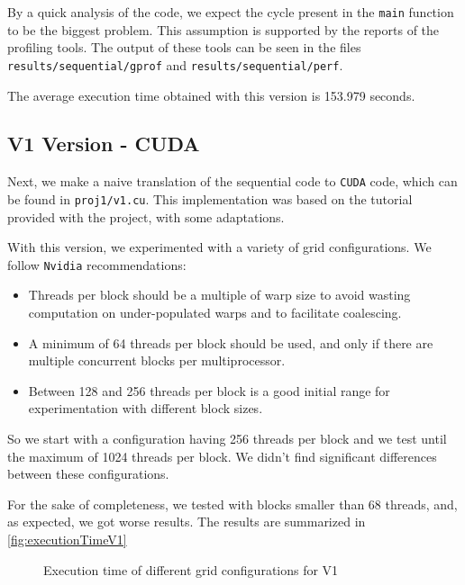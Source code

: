 \documentclass[conference]{IEEEtran}
\begin{document}
By a quick analysis of the code, we expect the cycle present in the \texttt{main} function to be the biggest problem. This assumption is supported by the reports of the profiling tools. The output of these tools can be seen in the files \texttt{results/sequential/gprof} and \texttt{results/sequential/perf}.

The average execution time obtained with this version is 153.979 seconds.

\subsection{V1 Version - CUDA}
Next, we make a naive translation of the sequential code to \texttt{CUDA} code, which can be found in \texttt{proj1/v1.cu}. This implementation was based on the tutorial provided with the project, with some adaptations.\cite{SolvingHeatEquation}

With this version, we experimented with a variety of grid configurations. We follow \texttt{Nvidia} recommendations\cite{CUDABestPractices}:

\begin{itemize}
  \item Threads per block should be a multiple of warp size to avoid wasting computation on under-populated warps and to facilitate coalescing.
  \item A minimum of 64 threads per block should be used, and only if there are multiple concurrent blocks per multiprocessor.
  \item Between 128 and 256 threads per block is a good initial range for experimentation with different block sizes.
\end{itemize}

So we start with a configuration having 256 threads per block and we test until the maximum of 1024 threads per block. We didn't find significant differences between these configurations.

For the sake of completeness, we tested with blocks smaller than 68 threads, and, as expected, we got worse results. The results are summarized in \autoref{fig:executionTimeV1}


\begin{figure}[ht]
  \centering
  \caption{Execution time of different grid configurations for V1}
  \label{fig:executionTimeV1}
\end{figure}
\end{document}
